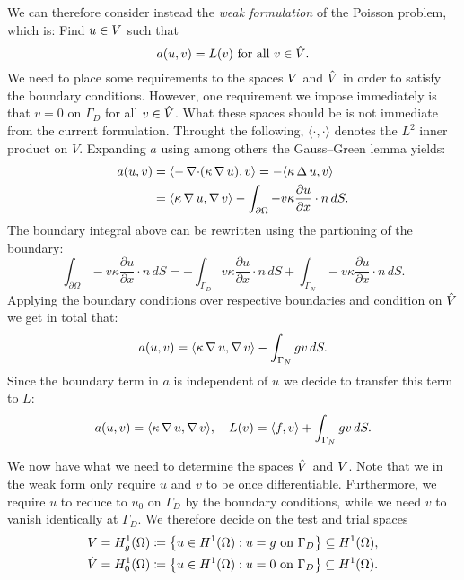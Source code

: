 We can therefore consider instead the \emph{weak formulation} of the Poisson
problem, which is: Find \( u \in V \) such that 
\begin{equation}
    a(u, v) = L(v) \text{ for all } v \in \hat{V}.
\end{equation}
We need to place some requirements to the spaces \(V \) and \(\hat{V}\) in
order to satisfy the boundary conditions. However, one requirement we impose
immediately is that \(v = 0\) on \( \Gamma_D \) for all \( v \in \hat{V}\).  What
these spaces should be is not immediate from the current formulation. Throught
the following, \( \langle \cdot, \cdot \rangle \) denotes the \( L^2 \) inner
product on \( V \). Expanding \( a \) using among others the Gauss--Green
lemma yields:
\begin{align}
    a(u, v) &= \langle -\operatorname{\nabla \cdot}(\kappa \operatorname{\nabla} u), v \rangle = -\langle \kappa \operatorname{\Delta} u, v \rangle\\
            &= \langle \kappa \operatorname{\nabla} u, \operatorname{\nabla} v \rangle - \int_{\partial\Omega} - v \kappa  \frac{\partial u}{\partial x}  \cdot n \, dS.
\end{align}
The boundary integral above can be rewritten using the partioning of the boundary:
\begin{equation}
    \int_{\partial\Omega} -v \kappa  \frac{\partial u}{\partial x}  \cdot n \, dS =
    -\int_{\Gamma_D} v \kappa \frac{\partial u}{\partial x} \cdot n \, dS + \int_{\Gamma_N} -v \kappa \frac{\partial u}{\partial x} \cdot n \, dS.
\end{equation}
Applying the boundary conditions over respective boundaries and condition on \(
\hat{V} \) we get in total that:
\begin{equation}
    a(u, v) = \langle \kappa\operatorname{\nabla} u, \operatorname{\nabla} v \rangle - \int_{\Gamma_N} g v \, dS.
\end{equation}
Since the boundary term in \( a \) is independent of \( u \) we decide to
transfer this term to \( L \):
\begin{equation}
    a(u, v) = \langle \kappa\operatorname{\nabla} u, \operatorname{\nabla} v \rangle, \quad L(v) = \langle f, v
    \rangle + \int_{\Gamma_N} g v \, dS.
\end{equation}


We now have what we need to determine the spaces \( \hat{V} \) and \( V \).
Note that we in the weak form only require \( u \) and \( v \) to be once
differentiable. Furthermore, we require \( u \) to reduce to \( u_0 \) on \(
\Gamma_D \) by the boundary conditions, while we need \( v \) to vanish
identically at \(\Gamma_D\). We therefore decide on the test and trial spaces
\begin{align}
    V &= H^1_g(\Omega) \coloneqq \left\{ u \in H^1(\Omega) : u = g \text{ on } \Gamma_D \right\} \subseteq H^1(\Omega),\\
    \hat{V} &= H^1_0(\Omega) \coloneqq \left\{ u \in H^1(\Omega) : u = 0 \text{ on } \Gamma_D \right\} \subseteq H^1 (\Omega).
\end{align}

